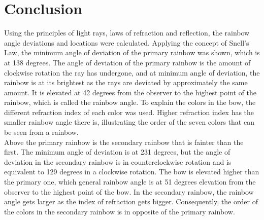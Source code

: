 \documentclass[a4paper,12pt]{article}
\begin{document}
\section{Conclusion}

Using the principles of light rays, laws of refraction and reflection, the rainbow angle deviations and locations were calculated. Applying the concept of Snell’s Law, the minimum angle of deviation of the primary rainbow was shown, which is at 138 degrees. The angle of deviation of the primary rainbow is the amount of clockwise rotation the ray has undergone, and at minimum angle of deviation, the rainbow is at its brightest as the rays are deviated by approximately the same amount. It is elevated at 42 degrees from the observer to the highest point of the rainbow, which is called the rainbow angle. To explain the colors in the bow, the different refraction index of each color was used. Higher refraction index has the smaller rainbow angle there is, illustrating the order of the seven colors that can be seen from a rainbow.\\
 
Above the primary rainbow is the secondary rainbow that is fainter than the first. The minimum angle of deviation is at 231 degrees, but the angle of deviation in the secondary rainbow is in counterclockwise rotation and is equivalent to 129 degrees in a clockwise rotation. The bow is elevated higher than the primary one, which general rainbow angle is at 51 degrees elevation from the observer to the highest point of the bow. In the secondary rainbow, the rainbow angle gets larger as the index of refraction gets bigger. Consequently, the order of the colors in the secondary rainbow is in opposite of the primary rainbow.

\printbibliography
\end{document}
